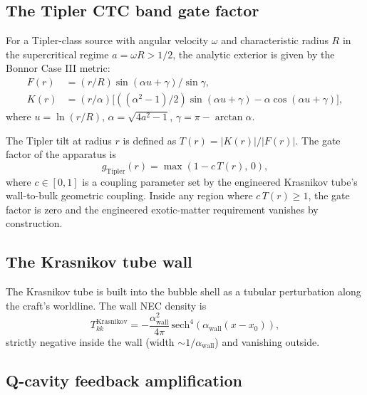 \documentclass[11pt,a4paper]{article}
\begin{document}
\subsection{The Tipler CTC band gate factor}

For a Tipler-class source with angular velocity $\omega$ and characteristic radius $R$ in the supercritical regime $a = \omega R > 1/2$, the analytic exterior is given by the Bonnor Case III metric:
\begin{align*}
F(r) &= (r/R)\sin(\alpha u+\gamma)/\sin\gamma,\\
K(r) &= (r/\alpha)\bigl[((\alpha^{2}-1)/2)\sin(\alpha u+\gamma) - \alpha\cos(\alpha u+\gamma)\bigr],
\end{align*}
where $u = \ln(r/R)$, $\alpha = \sqrt{4a^2 - 1}$, $\gamma = \pi - \arctan\alpha$.

The Tipler tilt at radius $r$ is defined as $T(r) = |K(r)|/|F(r)|$. The gate factor of the apparatus is
\begin{equation*}
g_{\mathrm{Tipler}}(r) = \max(1 - c\,T(r),\,0),
\end{equation*}
where $c \in [0, 1]$ is a coupling parameter set by the engineered Krasnikov tube's wall-to-bulk geometric coupling. Inside any region where $c\,T(r) \ge 1$, the gate factor is zero and the engineered exotic-matter requirement vanishes by construction.

\subsection{The Krasnikov tube wall}

The Krasnikov tube is built into the bubble shell as a tubular perturbation along the craft's worldline. The wall NEC density is
\begin{equation*}
T_{kk}^{\mathrm{Krasnikov}} = -\frac{\alpha_{\mathrm{wall}}^{2}}{4\pi}\,\mathrm{sech}^{4}(\alpha_{\mathrm{wall}}(x - x_{0})),
\end{equation*}
strictly negative inside the wall (width $\sim 1/\alpha_{\mathrm{wall}}$) and vanishing outside.

\subsection{Q-cavity feedback amplification}
\end{document}
